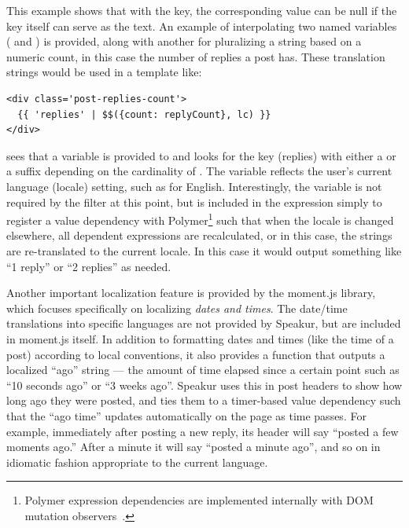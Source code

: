 This example shows that with the  key, the corresponding value can be null if the key itself can serve as the text. 
An example of interpolating two named variables ( and ) is provided, 
along with another for pluralizing a string based on a numeric count, in this case the number of replies a post has.
These translation strings would be used in a template like:

\begin{lstlisting}[language=HTML5,caption={Internationalizing a data-bound template.},label=l:i18n_template,captionpos=below]
<div class='post-replies-count'>
  {{ 'replies' | $$({count: replyCount}, lc) }}
</div>
\end{lstlisting}

 sees that a  variable is provided to \tcode{\$\$} and looks for the key (replies) with either a  or a  suffix depending on the cardinality of .
The  variable reflects the user's current language (locale) setting, such as  for English.
Interestingly, the  variable is not required by the \tcode{\$\$} filter at this point,
but is included in the expression simply to register a value dependency with Polymer\footnote{
Polymer expression dependencies are implemented internally with DOM mutation observers~\cite{polymercontributors2015-b}.} 
such that when the locale is changed elsewhere, all dependent expressions are recalculated, or in this case, the strings are re-translated to the current locale.
In this case it would output something like ``1 reply'' or ``2 replies'' as needed.


Another important localization feature is provided by the moment.js library, 
which focuses specifically on localizing \textit{dates and times}.
The date/time translations into specific languages are not provided by Speakur, 
but are included in moment.js itself.
In addition to formatting dates and times (like the time of a post) according to local conventions, 
it also provides a  function that outputs a localized ``ago'' string --- the amount of time elapsed since a certain point such as ``10 seconds ago'' or ``3 weeks ago''.
Speakur uses this in post headers to show how long ago they were posted,
and ties them to a timer-based value dependency such that the ``ago time'' updates automatically on the page as time passes. 
For example, immediately after posting a new reply, its header will say ``posted a few moments ago.'' 
After a minute it will say ``posted a minute ago'', and so on in idiomatic fashion appropriate to the current language.

